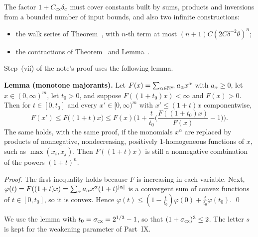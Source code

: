 \begin{detail}\label{xa:d-majorant}
The factor $1+C_{\rm cx}\delta_c$ must cover constants built by sums, products and inversions from a bounded number of input bounds, and also two infinite constructions:
\begin{itemize}
\item the walk series of Theorem~, with $n$-th term at most $(n+1)C(2C\delta^{-2}\theta)^n$;
\item the contractions of Theorem~ and Lemma~.
\end{itemize}
Step~(vii) of the note's proof uses the following lemma.

\textbf{Lemma (monotone majorants).} Let $F(x)=\sum_{\alpha\in\mathbb N^m}a_\alpha x^\alpha$ with $a_\alpha\ge0$, let $x\in(0,\infty)^m$, let $t_0>0$, and suppose $F((1+t_0)x)<\infty$ and $F(x)>0$. Then for $t\in[0,t_0]$ and every $x'\in[0,\infty)^m$ with $x'\le(1+t)x$ componentwise,
\[
F(x')\le F\big((1+t)x\big)\le F(x)\Big(1+\frac t{t_0}\Big(\frac{F((1+t_0)x)}{F(x)}-1\Big)\Big).
\]
The same holds, with the same proof, if the monomials $x^\alpha$ are replaced by products of nonnegative, nondecreasing, positively $1$-homogeneous functions of $x$, such as $\max(x_i,x_j)$. Then $F((1+t)x)$ is still a nonnegative combination of the powers $(1+t)^n$.

\emph{Proof.} The first inequality holds because $F$ is increasing in each variable. Next, $\varphi(t)=F((1+t)x)=\sum_\alpha a_\alpha x^\alpha(1+t)^{\lvert\alpha\rvert}$ is a convergent sum of convex functions of $t\in[0,t_0]$, so it is convex. Hence $\varphi(t)\le(1-\frac t{t_0})\varphi(0)+\frac t{t_0}\varphi(t_0)$. \qed

We use the lemma with $t_0=\sigma_{\rm cx}=2^{1/3}-1$, so that $(1+\sigma_{\rm cx})^3\le2$. The letter $s$ is kept for the weakening parameter of Part~IX.


\end{detail}
